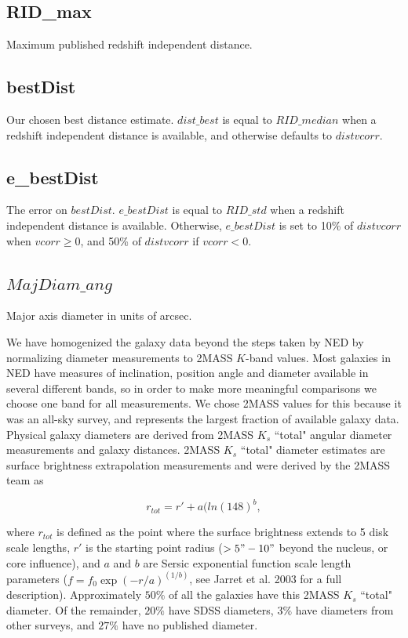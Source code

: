 \documentclass[iop]{emulateapj-rtx4}
\begin{document}
\subsection{RID\_max}
Maximum published redshift independent distance.

\subsection{bestDist}
Our chosen best distance estimate. $dist\_best$ is equal to $RID\_median$ when a redshift independent distance is available, and otherwise defaults to $distvcorr$.

\subsection{e\_bestDist}
The error on $bestDist$. $e\_bestDist$ is equal to $RID\_std$ when a redshift independent distance is available. Otherwise, $e\_bestDist$ is set to 10\% of $distvcorr$ when $vcorr \geq 0$, and 50\% of $distvcorr$ if $vcorr < 0$.

\subsection{$MajDiam\_ang$} \label{diameters}
Major axis diameter in units of arcsec.

We have homogenized the galaxy data beyond the steps taken by NED by normalizing diameter measurements to 2MASS $K$-band values. Most galaxies in NED have measures of inclination, position angle and diameter available in several different bands, so in order to make more meaningful comparisons we choose one band for all measurements. We chose 2MASS values for this because it was an all-sky survey, and represents the largest fraction of available galaxy data. Physical galaxy diameters are derived from 2MASS $K_s$ ``total" angular diameter measurements and galaxy distances. 2MASS $K_s$ ``total" diameter estimates are surface brightness extrapolation measurements and were derived by the 2MASS team as 

\begin{equation}
r_{tot} = r' + a(ln(148)^b,
\end{equation}

\noindent where $r_{tot}$ is defined as the point where the surface brightness extends to 5 disk scale lengths, $r'$ is the starting point radius ($>5" - 10"$ beyond the nucleus, or core influence), and $a$ and $b$ are Sersic exponential function scale length parameters ($f = f_0 \exp{(-r/a)}^{(1/b)}$, see Jarret et al. 2003 for a full description). Approximately $50\%$ of all the galaxies have this 2MASS $K_s$ ``total" diameter. Of the remainder, $20\%$ have SDSS diameters, $3\%$ have diameters from other surveys, and $27\%$ have no published diameter. 
\end{document}
